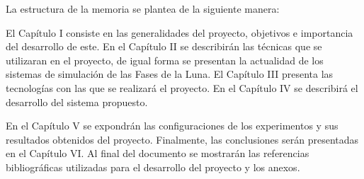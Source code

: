 La estructura de la memoria se plantea de la siguiente manera:

El Capítulo I consiste en las generalidades del proyecto, objetivos e importancia del desarrollo de este. En el Capítulo II se describirán las técnicas que se utilizaran en el proyecto, de igual forma se presentan la actualidad de los sistemas de simulación de las Fases de la Luna. El Capítulo III presenta las tecnologías con las que se realizará el proyecto. En el Capítulo IV se describirá el desarrollo del sistema propuesto.

En el Capítulo V se expondrán las configuraciones de los experimentos y sus resultados obtenidos del proyecto. Finalmente, las conclusiones serán presentadas en el Capítulo VI. Al final del documento se mostrarán las referencias bibliográficas utilizadas para el desarrollo del proyecto y los anexos.
